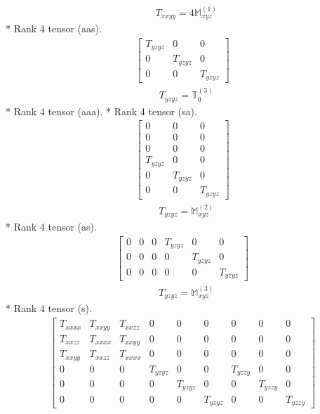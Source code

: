 \documentclass[fleqn,8pt,landscape]{jsarticle}
\begin{document}
\begin{align*}
& T_{xxyy} = 4 \mathbb{M}_{xyz}^{(1)}
\end{align*}
* Rank 4 tensor (aas).
\begin{align*}
\begin{bmatrix} T_{yzyz} & 0 & 0 \\ 0 & T_{yzyz} & 0 \\ 0 & 0 & T_{yzyz} \end{bmatrix}
\end{align*}
\begin{align*}
& T_{yzyz} = \mathbb{T}_{0}^{(3)}
\end{align*}
* Rank 4 tensor (aaa).
* Rank 4 tensor (sa).
\begin{align*}
\begin{bmatrix} 0 & 0 & 0 \\ 0 & 0 & 0 \\ 0 & 0 & 0 \\ T_{yzyz} & 0 & 0 \\ 0 & T_{yzyz} & 0 \\ 0 & 0 & T_{yzyz} \end{bmatrix}
\end{align*}
\begin{align*}
& T_{yzyz} = \mathbb{M}_{xyz}^{(2)}
\end{align*}
* Rank 4 tensor (as).
\begin{align*}
\begin{bmatrix} 0 & 0 & 0 & T_{yzyz} & 0 & 0 \\ 0 & 0 & 0 & 0 & T_{yzyz} & 0 \\ 0 & 0 & 0 & 0 & 0 & T_{yzyz} \end{bmatrix}
\end{align*}
\begin{align*}
& T_{yzyz} = \mathbb{M}_{xyz}^{(3)}
\end{align*}
* Rank 4 tensor (s).
\begin{align*}
\begin{bmatrix} T_{xxxx} & T_{xxyy} & T_{xxzz} & 0 & 0 & 0 & 0 & 0 & 0 \\ T_{xxzz} & T_{xxxx} & T_{xxyy} & 0 & 0 & 0 & 0 & 0 & 0 \\ T_{xxyy} & T_{xxzz} & T_{xxxx} & 0 & 0 & 0 & 0 & 0 & 0 \\ 0 & 0 & 0 & T_{yzyz} & 0 & 0 & T_{yzzy} & 0 & 0 \\ 0 & 0 & 0 & 0 & T_{yzyz} & 0 & 0 & T_{yzzy} & 0 \\ 0 & 0 & 0 & 0 & 0 & T_{yzyz} & 0 & 0 & T_{yzzy} \end{bmatrix}
\end{align*}
\end{document}
